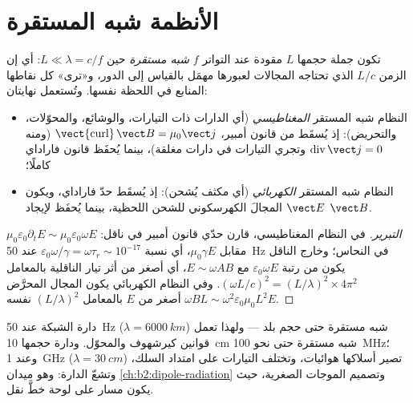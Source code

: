 \section{الأنظمة شبه المستقرة}

\begin{definition}\label{def:b2:maxwell-equations:arqs}
تكون جملة حجمها $L$ مقودة عند التواتر $f$ \emph{شبه مستقرة}
حين $L \ll \lambda = c/f$: أي إن الزمن $L/c$ الذي تحتاجه المجالات لعبورها
مهمَل بالقياس إلى الدور، و«ترى» كل نقاطها
المنابع في اللحظة نفسها. وتُستعمل نهايتان:
\begin{itemize}
  \item النظام شبه المستقر \emph{المغناطيسي} (أي الدارات ذات
        التيارات، والوشائع، والمحوّلات، والتحريض): إذ يُسقَط  من قانون أمبير، $\operatorname{\vect{curl}}\vect B
        = \mu_0\vect j$ (ومنه $\operatorname{div}\vect j = 0$ وتجري التيارات في
        دارات مغلقة)، بينما يُحفَظ قانون فاراداي كاملًا؛
  \item النظام شبه المستقر \emph{الكهربائي} (أي مكثف
        يُشحن): إذ يُسقَط حدّ فاراداي، ويكون $\vect E$ المجالَ
        الكهرسكوني للشحن اللحظية، بينما يُحفَظ
         لإيجاد $\vect B$.
\end{itemize}
\end{definition}

\begin{proof}[التبرير]
في النظام المغناطيسي، قارن حدّي قانون أمبير في
ناقل: $\mu_0\varepsilon_0\partial_t E \sim \mu_0\varepsilon_0\omega E$ مقابل $\mu_0\gamma E$،
أي نسبة $\varepsilon_0\omega/\gamma = \omega\tau_r \sim 10^{-17}$ عند \qty{50}{Hz} في النحاس؛
وخارج الناقل يكون  من رتبة
$\varepsilon_0\omega E$ مع $E \sim \omega AB$، أي أصغر من أثر تيار
الناقلية بالمعامل $(\omega L/c)^2 = (L/\lambda)^2 \times 4\pi^2$. وفي النظام
الكهربائي يكون المجال المحرَّض $\omega BL \sim \omega^2\varepsilon_0\mu_0L^2E$ أصغر من $E$
بالمعامل $(L/\lambda)^2$ نفسه.
\end{proof}

\begin{example}\label{ex:b2:maxwell-equations:sizes}
دارة الشبكة عند \qty{50}{Hz} ($\lambda = \qty{6000}{km}$) شبه مستقرة
حتى حجم بلد --- ولهذا تعمل قوانين كيرشهوف
والمحوّل. ودارة حجمها \qty{10}{cm} شبه مستقرة حتى نحو
\qty{100}{MHz}؛ وعند \qty{1}{GHz} ($\lambda = \qty{30}{cm}$) تصير أسلاكها هوائيات،
وتختلف التيارات على امتداد السلك، وتشعّ الدارة: وهو ميدان
\cref{ch:b2:dipole-radiation} وتصميم الموجات الصغرية، حيث يكون مسار
على لوحة خطَّ نقل.
\end{example}

